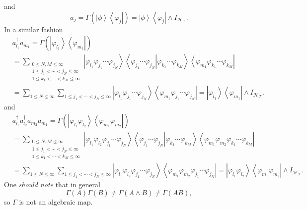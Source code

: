 \documentclass[aps,preprint,amsfonts,amssymb,showpacs,showkeys]{revtex4}%
\begin{document}
and%
\begin{equation}
a_{j}=\Gamma\left(  \left\vert \phi\right\rangle \left\langle \varphi
_{j}\right\vert \right)  =\left\vert \phi\right\rangle \left\langle
\varphi_{j}\right\vert \wedge I_{\mathcal{H}_{\mathcal{F}}}.\nonumber
\end{equation}
In a similar fashion
\begin{align}
&  a_{l_{1}}^{\dagger}a_{m_{1}}=\Gamma\left(  \left\vert \varphi_{l_{1}%
}\right\rangle \left\langle \varphi_{m_{1}}\right\vert \right) \nonumber\\
&  =\sum_{\substack{0\leq N,M\leq\infty\\1\leq j_{1}<\cdots<j_{N}\leq
\infty\\1\leq k_{1}<\cdots<k_{M}\leq\infty}}\left\vert \varphi_{l_{1}}%
\varphi_{j_{1}}\cdots\varphi_{j_{N}}\right\rangle \left\langle \left.
\varphi_{j_{1}}\cdots\varphi_{j_{N}}\right\vert \varphi_{k_{1}}\cdots
\varphi_{k_{M}}\right\rangle \left\langle \varphi_{m_{1}}\varphi_{k_{1}}%
\cdots\varphi_{k_{M}}\right\vert \nonumber\\
&  =\sum_{1\leq N\leq\infty}\sum_{1\leq j_{1}<\cdots<j_{N}\leq\infty
}\left\vert \varphi_{l_{1}}\varphi_{j_{1}}\cdots\varphi_{j_{N}}\right\rangle
\left\langle \varphi_{m_{1}}\varphi_{j_{1}}\cdots\varphi_{j_{N}}\right\vert
=\left\vert \varphi_{l_{1}}\right\rangle \left\langle \varphi_{m_{1}%
}\right\vert \wedge I_{\mathcal{H}_{\mathcal{F}}}.
\end{align}
and%
\begin{align}
&  a_{l_{1}}^{\dagger}a_{l_{2}}^{\dagger}a_{m_{2}}a_{m_{1}}=\Gamma\left(
\left\vert \varphi_{l_{1}}\varphi_{l_{2}}\right\rangle \left\langle
\varphi_{m_{1}}\varphi_{m_{2}}\right\vert \right) \nonumber\\
&  =\sum_{\substack{0\leq N,M\leq\infty\\1\leq j_{1}<\cdots<j_{N}\leq
\infty\\1\leq k_{1}<\cdots<k_{M}\leq\infty}}\left\vert \varphi_{l_{1}}%
\varphi_{l_{2}}\varphi_{j_{1}}\cdots\varphi_{j_{N}}\right\rangle \left\langle
\left.  \varphi_{j_{1}}\cdots\varphi_{j_{N}}\right\vert \varphi_{k_{1}}%
\cdots\varphi_{k_{M}}\right\rangle \left\langle \varphi_{m_{1}}\varphi_{m_{2}%
}\varphi_{k_{1}}\cdots\varphi_{k_{M}}\right\vert \nonumber\\
&  =\sum_{1\leq N\leq\infty}\sum_{1\leq j_{1}<\cdots<j_{N}\leq\infty
}\left\vert \varphi_{l_{1}}\varphi_{l_{2}}\varphi_{j_{1}}\cdots\varphi_{j_{N}%
}\right\rangle \left\langle \varphi_{m_{1}}\varphi_{m_{2}}\varphi_{j_{1}%
}\cdots\varphi_{j_{N}}\right\vert =\left\vert \varphi_{l_{1}}\varphi_{l_{2}%
}\right\rangle \left\langle \varphi_{m_{1}}\varphi_{m_{2}}\right\vert \wedge
I_{\mathcal{H}_{\mathcal{F}}}.
\end{align}
One \emph{should note} that in general
\begin{equation}
\Gamma\left(  A\right)  \Gamma\left(  B\right)  \neq\Gamma\left(  A\wedge
B\right)  \neq\Gamma\left(  AB\right)  ,
\end{equation}
so $\Gamma$ is not an algebraic map.
\end{document}
